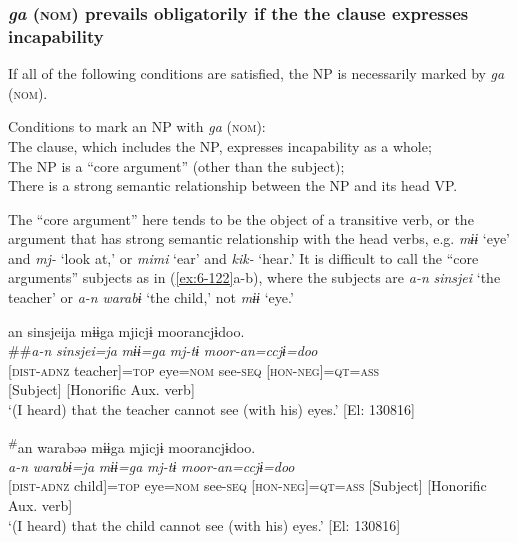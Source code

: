 \subsubsection{\textit{ga} (\textsc{nom}) prevails obligatorily if the the clause expresses incapability}

If all of the following conditions are satisfied, the NP is necessarily marked by \textit{ga} (\textsc{nom}).

\begin{styleBeschriftung}
\textmd{\ea\label{ex:6-121}
 Conditions to mark an NP with} \textmd{\textit{ga}}\textmd{ (\textsc{nom}):}\\

\ea  The clause, which includes the NP, expresses incapability as a whole;\\
\ex The NP is a “core argument” (other than the subject);\\
\ex There is a strong semantic relationship between the NP and its head VP.\\
\z
\z

The “core argument” here tends to be the object of a transitive verb, or the argument that has strong semantic relationship with the head verbs, e.g. \textit{mɨɨ} ‘eye’ and \textit{mj-} ‘look at,’ or \textit{mimi} ‘ear’ and \textit{kik-} ‘hear.’ It is difficult to call the “core arguments” subjects as in (\ref{ex:6-122}a-b), where the subjects are \textit{a-n} \textit{sinsjei} ‘the teacher’ or \textit{a-n} \textit{warabɨ} ‘the child,’ not \textit{mɨɨ} ‘eye.’

\ea\label{ex:6-122}
\ea
{\TM}
\glll an  sinsjeija  mɨɨga  mjicjɨ  moorancjɨdoo.\\##\textit{a-n}  \textit{sinsjei=ja}  \textit{mɨɨ=ga}  \textit{mj-tɨ}  \textit{moor-an=ccjɨ=doo}\\
      {}[\textsc{dist}-\textsc{adnz}  teacher]=\textsc{top}  eye=\textsc{nom}  see-\textsc{seq}  [\textsc{hon}-\textsc{neg}]=\textsc{qt}=\textsc{ass}\\
      {}[Subject]      [Honorific Aux. verb]\\
\glt ‘(I heard) that the teacher cannot see (with his) eyes.’ [El: 130816]

\ex
  {\TM}
  \glll \textsuperscript{\#}an  warabəə  mɨɨga  mjicjɨ  moorancjɨdoo.\\
       \textit{a-n}  \textit{warabɨ=ja}  \textit{mɨɨ=ga}  \textit{mj-tɨ}  \textit{moor-an=ccjɨ=doo}\\
      {}[\textsc{dist}-\textsc{adnz}  child]=\textsc{top}  eye=\textsc{nom}  see-\textsc{seq}  [\textsc{hon}-\textsc{neg}]=\textsc{qt}=\textsc{ass}
      {}[Subject]      [Honorific Aux. verb]\\
 ‘(I heard) that the child cannot see (with his) eyes.’ [El: 130816]
\z
\z


\end{styleBeschriftung}
